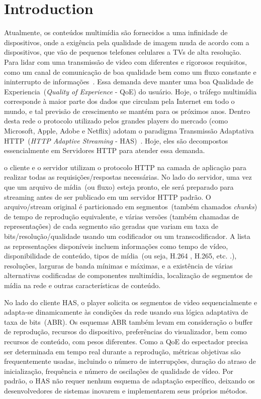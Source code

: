\section{Introduction}
\label{sec:intro}

Atualmente, os conteúdos multimídia são fornecidos a uma infinidade de dispositivos, onde a exigência pela qualidade de imagem muda de acordo com a dispositivos, que vão de pequenos telefones celulares a TVs de alta resolução. Para lidar com uma transmissão de video com diferentes e rigorosos requisitos, como um canal de comunicação de boa qualidade bem como um fluxo constante e ininterrupto de informações~\cite{Immich2018WinNet}. Essa demanda deve manter uma boa Qualidade de Experiencia~(\textit{Quality of Experience} - QoE) do usuário. Hoje, o tráfego multimídia corresponde à maior parte dos dados que circulam pela Internet em todo o mundo, e tal previsão de crescimento se mantém  para os próximos anos. 
Dentro desta rede o protocolo utilizado pelos grandes players do mercado (como Microsoft, Apple, Adobe e Netflix) adotam o paradigma Transmissão Adaptativa HTTP~(\textit{HTTP Adaptive Streaming} - HAS)~\cite{company:dashs}. Hoje, eles são decompostos essencialmente em Servidores HTTP para atender essa demanda.

o cliente e o servidor utilizam o protocolo HTTP na camada de aplicação para realizar todas as requisições/respostas necessárias. No lado do servidor, uma vez que um arquivo de mídia~(ou fluxo) esteja pronto, ele será preparado para streaming antes de ser publicado em um servidor HTTP padrão. O arquivo/stream original é particionado em segmentos~(também chamados \textit{chunks}) de tempo de reprodução equivalente, e várias versões (também chamadas de representações) de cada segmento são geradas que variam em taxa de bits/resolução/qualidade usando um codificador ou um transcodificador.
A lista as representações disponíveis incluem informações como tempo de vídeo, disponibilidade de conteúdo, tipos de mídia~(ou seja, H.264 , H.265, etc. .), resoluções, larguras de banda mínimas e máximas, e a existência de várias alternativas codificadas de componentes multimídia, localização de segmentos de mídia na rede e outras características de conteúdo.

No lado do cliente HAS, o player solicita os segmentos de video sequencialmente e adapta-se dinamicamente às condições da rede usando sua lógica adaptativa de taxa de bits~(ABR). Os esquemas ABR também levam em consideração o buffer de reprodução, recursos do dispositivo, preferências do visualizador, bem como recursos de conteúdo, com pesos diferentes.
Como a QoE do espectador precisa ser determinada em tempo real durante a reprodução, métricas objetivas são frequentemente usadas, incluindo o número de interrupções, duração do atraso de inicialização, frequência e número de oscilações de qualidade de vídeo. Por padrão, o HAS não requer nenhum esquema de adaptação específico, deixando os desenvolvedores de sistemas inovarem e implementarem seus próprios métodos.

